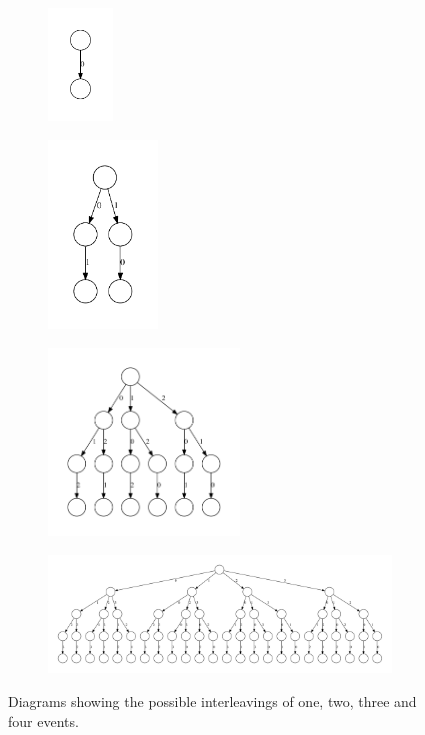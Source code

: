 \documentclass[12pt,a4paper,twoside,openany]{report}
\begin{document}
\begin{figure}
	\centering
	\begin{subfigure}{0.15\textwidth}
		\centering
		\includegraphics*[height=3cm]{explosion1}
	\end{subfigure}
	\quad
	\begin{subfigure}{0.25\textwidth}
		\centering
		\includegraphics*[height=5cm]{explosion2}
	\end{subfigure}
	\quad
	\begin{subfigure}{0.5\textwidth}
		\centering
		\includegraphics*[height=5cm]{explosion3}
	\end{subfigure}
	\begin{subfigure}{\textwidth}
		\centering
		\includegraphics*[width=\textwidth]{explosion4}
	\end{subfigure}
	\caption[Illustration of the state explosion problem.]
		{Diagrams showing the possible interleavings of
			one, two, three and four events.}
	\label{fig:state-explosion}
	

\end{figure}
\end{document}
